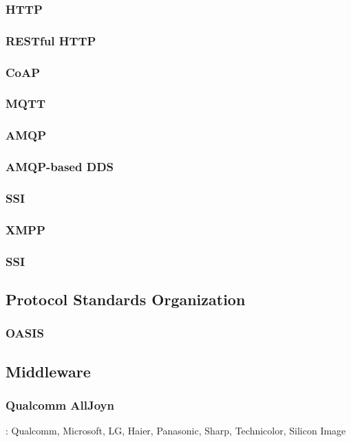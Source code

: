 \documentclass{myproc}
\begin{document}
\subsubsection{HTTP}
\subsubsection{RESTful HTTP}
\subsubsection{CoAP}
\subsubsection{MQTT}
\subsubsection{AMQP}
\subsubsection{AMQP-based DDS}
\subsubsection{SSI}
\subsubsection{XMPP}
\subsubsection{SSI}


\subsection{Protocol Standards Organization}
\subsubsection{\textcolor{red2}{OASIS}}

\subsection{Middleware}
\subsubsection{\textcolor{red2}{\textbf{}Qualcomm AllJoyn}}
\bit
\w {}: Qualcomm, Microsoft, LG, Haier, Panasonic, Sharp,
       Technicolor, Silicon Image
\eit
\end{document}
